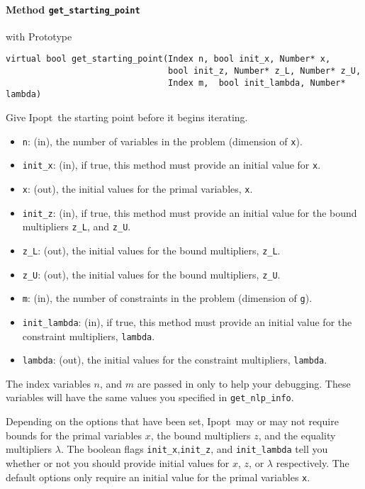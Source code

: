 \documentclass[letter,10pt]{article}
\newcommand{\Ipopt}{{\sc Ipopt}}
\begin{document}
\paragraph{Method {\texttt{get\_starting\_point}}} with Prototype
\begin{verbatim}
virtual bool get_starting_point(Index n, bool init_x, Number* x,
                                bool init_z, Number* z_L, Number* z_U,
                                Index m,  bool init_lambda, Number* lambda)
\end{verbatim}
Give \Ipopt\ the starting point before it begins iterating.
\begin{itemize}
\item {\tt n}: (in), the number of variables in the problem (dimension of {\tt x}). 
\item {\tt init\_x}: (in), if true, this method must provide an initial value for {\tt x}.
\item {\tt x}: (out), the initial values for the primal variables, {\tt x}.
\item {\tt init\_z}: (in), if true, this method must provide an initial value 
        for the bound multipliers {\tt z\_L}, and {\tt z\_U}.
\item {\tt z\_L}: (out), the initial values for the bound multipliers, {\tt z\_L}.
\item {\tt z\_U}: (out), the initial values for the bound multipliers, {\tt z\_U}.
\item {\tt m}: (in), the number of constraints in the problem (dimension of {\tt g}).
\item {\tt init\_lambda}: (in), if true, this method must provide an initial value 
        for the constraint multipliers, {\tt lambda}.
\item {\tt lambda}: (out), the initial values for the constraint multipliers, {\tt lambda}.
\end{itemize}

The index variables $n$, and $m$ are passed in only to help your
debugging. These variables will have the same values you specified in
{\tt get\_nlp\_info}.

Depending on the options that have been set,
\Ipopt\ may or may not require bounds for the primal variables $x$, the
bound multipliers $z$, and the equality multipliers $\lambda$. The
boolean flags {\tt init\_x},{\tt init\_z}, and {\tt init\_lambda} tell
you whether or not you should provide initial values for $x$, $z$, or
$\lambda$ respectively. The default options only require an
initial value for the primal variables {\tt x}.
\end{document}
